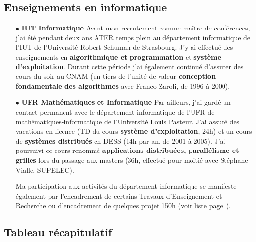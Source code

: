 \documentclass[11pt]{article}
\begin{document}
\subsection{Enseignements en informatique}

\noindent
\begin{itemize}
\item[$\bullet$] \textbf{IUT Informatique}
Avant mon recrutement comme maître de conférences, j'ai été pendant deux ans ATER temps plein
au département informatique de l'IUT de l'Université Robert Schuman de Strasbourg.
J'y ai effectué des enseignements en \textbf{algorithmique et programmation} et 
\textbf{système d'exploitation}. Durant cette période j'ai également continué 
d'assurer des cours du soir au CNAM 
(un tiers de l'unité de valeur \textbf{conception fondamentale des algorithmes} 
avec Franco Zaroli, de 1996 à 2000).\\

\item[$\bullet$] \textbf{UFR Mathématiques et Informatique}
Par ailleurs, j'ai gardé un contact permanent avec le département informatique 
de l'UFR de mathématiques-informatique de l'Université Louis Pasteur. 
J'ai assuré des vacations en licence (TD du cours \textbf{système d'exploitation}, 24h)
et un cours de \textbf{systèmes distribués} en DESS (14h par an, de 2001 à 2005).
J'ai poursuivi ce cours renommé \textbf{applications distribuées, parallélisme et grilles}
lors du passage aux masters (36h, effectué pour moitié avec Stéphane Vialle, SUPELEC).


Ma participation aux activités du département informatique se manifeste également par 
l'encadrement de certains Travaux d'Enseignement et Recherche ou d'encadrement 
de quelques projet 150h (voir liste page~\pageref{sc:encadre-autres}).
\end{itemize}




\subsection{Tableau récapitulatif}
\label{sc:tab-ens}
\end{document}
